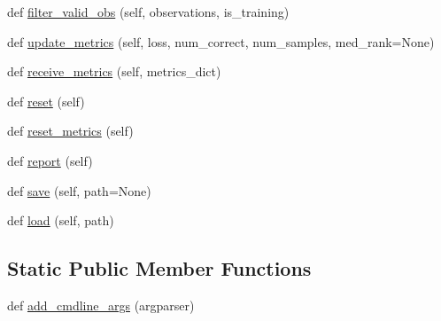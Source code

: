 \begin{DoxyCompactItemize}
def \hyperlink{classprojects_1_1personality__captions_1_1transresnet_1_1transresnet_1_1TransresnetAgent_aa3ad5410a6cb1ef7f730ba0fda5b673c}{filter\+\_\+valid\+\_\+obs} (self, observations, is\+\_\+training)
\item 
def \hyperlink{classprojects_1_1personality__captions_1_1transresnet_1_1transresnet_1_1TransresnetAgent_a59ccc8175318115d066f550659de70d3}{update\+\_\+metrics} (self, loss, num\+\_\+correct, num\+\_\+samples, med\+\_\+rank=None)
\item 
def \hyperlink{classprojects_1_1personality__captions_1_1transresnet_1_1transresnet_1_1TransresnetAgent_a969be7eaa4f82bb64b449b9750ddb383}{receive\+\_\+metrics} (self, metrics\+\_\+dict)
\item 
def \hyperlink{classprojects_1_1personality__captions_1_1transresnet_1_1transresnet_1_1TransresnetAgent_a8d88f87cd908c48580910e8458c873b3}{reset} (self)
\item 
def \hyperlink{classprojects_1_1personality__captions_1_1transresnet_1_1transresnet_1_1TransresnetAgent_a9940b8a9a9a8ceca55058684e81d3898}{reset\+\_\+metrics} (self)
\item 
def \hyperlink{classprojects_1_1personality__captions_1_1transresnet_1_1transresnet_1_1TransresnetAgent_a1bbc4e55caf459f68c67a9baa202605a}{report} (self)
\item 
def \hyperlink{classprojects_1_1personality__captions_1_1transresnet_1_1transresnet_1_1TransresnetAgent_a9bacab7aeb7c9f795c72ee7d36867ee4}{save} (self, path=None)
\item 
def \hyperlink{classprojects_1_1personality__captions_1_1transresnet_1_1transresnet_1_1TransresnetAgent_ae8a9b4cd65c4440314769206a4c821b8}{load} (self, path)
\end{DoxyCompactItemize}
\subsection*{Static Public Member Functions}
\begin{DoxyCompactItemize}
\item 
def \hyperlink{classprojects_1_1personality__captions_1_1transresnet_1_1transresnet_1_1TransresnetAgent_a076b5b97fbc703f87e4bbee6fe0651db}{add\+\_\+cmdline\+\_\+args} (argparser)
\end{DoxyCompactItemize}
